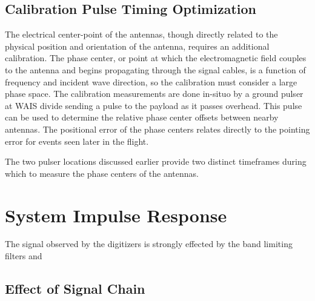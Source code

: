 		
	\subsection{Calibration Pulse Timing Optimization}
		The electrical center-point of the antennas, though directly related to the physical position and orientation of the antenna, requires an additional calibration.  The phase center, or point at which the electromagnetic field couples to the antenna and begins propagating through the signal cables, is a function of frequency and incident wave direction, so the calibration must consider a large phase space.  The calibration measurements are done in-situo by a ground pulser at WAIS divide sending a pulse to the payload as it passes overhead.  This pulse can be used to determine  the relative phase center offsets between nearby antennas.  The positional error of the phase centers relates directly to the pointing error for events seen later in the flight.
		
		The two pulser locations discussed earlier provide two distinct timeframes during which to measure the phase centers of the antennas.  

\section{System Impulse Response}
		The signal observed by the digitizers is strongly effected by the band limiting filters and 
		
	\subsection{Effect of Signal Chain}
	
